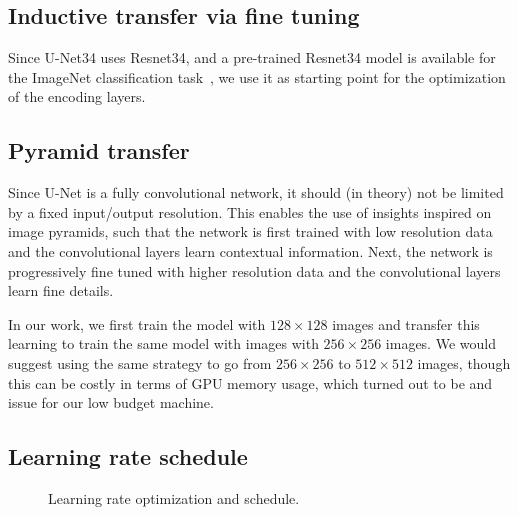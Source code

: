 \documentclass{article}
\begin{document}
\subsection{Inductive transfer via fine tuning}
Since U-Net34 uses Resnet34, and a pre-trained Resnet34 model is available
for the ImageNet classification task~\cite{russakovsky_etal_ILSVRC_ijcv2015}, we use it as starting point
for the optimization of the encoding layers.

\subsection{Pyramid transfer} %
Since U-Net is a fully convolutional network, it should
(in theory) not be limited by a fixed input/output resolution.
This enables the use of insights inspired on image pyramids,
such that the network is first trained with low resolution
data and the convolutional layers learn contextual information.
Next, the network is progressively fine tuned with higher resolution
data and the convolutional layers learn fine details.

In our work, we first train the model with $128\times128$ images
and transfer this learning to train the same model with images with
$256\times256$ images. We would suggest using the same strategy to go from
$256\times256$ to $512\times512$ images, though this can be costly
in terms of GPU memory usage, which turned out to be and issue
for our low budget machine.

\subsection{Learning rate schedule}
\begin{figure}
  \centering
  \hfill
  \hfil
\caption{Learning rate optimization and schedule.}\label{lr_find_chart}
\end{figure}
\end{document}
